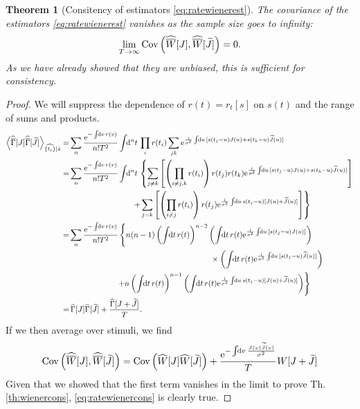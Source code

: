 \documentclass[12pt]{article}
\theoremstyle{slplain}
\newtheorem{thm}{Theorem}
\theoremstyle{sldefinition}
\theoremstyle{remark}
\newcommand{\tj}{\widetilde{J}}
\newcommand{\hz}{\widehat{\Gamma}}
\newcommand{\hhz}{\widehat{\overline{\Gamma}}}
\newcommand{\hw}{\widehat{W}}
\newcommand{\hhw}{\widehat{\overline{W}}}
\begin{document}
\begin{thm}[Consitency of estimators \eqref{eq:ratewienerest}]
  The covariance of the estimators \eqref{eq:ratewienerest} vanishes as the sample size goes to infinity:
  \begin{equation}\label{eq:ratewienercons}
    \lim_{T\to\infty} \cov\prn{ \hhw[J], \hhw[\tj] } = 0.
  \end{equation}
  As we have already showed that they are unbiased, this is sufficient for consistency.
\end{thm}
\begin{proof}
  We will suppress the dependence of $r(t)=r_t[s]$ on $s(t)$ and the range of sums and products.
  \begin{equation*}
    \begin{aligned}
      \av{\hhz[J]\hhz[\tj]}_{\widehat{\{t_i\}}|\hat{s}} =& \sum_n \frac{\e^{-\intd{v}r(v)}}{n!T^2} \intd{^nt} \prod_ir(t_i) \sum_{jk} \e^{\frac{\ir}{\sigma^2}\intd{u}[s(t_j-u)J(u)+s(t_k-u)\tj(u)]} \\
        =& \sum_n \frac{\e^{-\intd{v}r(v)}}{n!T^2} \intd{^nt} \left\{
         \sum_{j\neq k} \brk{\prn{\prod_{i\neq j,k} r(t_i)} r(t_j) r(t_k) \e^{\frac{\ir}{\sigma^2}\intd{u}[s(t_j-u)J(u)+s(t_k-u)\tj(u)]}}
        \right. \\&\left. \qquad\qquad\qquad\qquad
         + \sum_{j=k} \brk{\prn{\prod_{i\neq j} r(t_i)} r(t_j) \e^{\frac{\ir}{\sigma^2}\intd{u}s(t_j-u)[J(u)+\tj(u)]}}
        \right\} \\
      =& \sum_n \frac{\e^{-\intd{v}r(v)}}{n!T^2} \left\{
         n(n-1) \prn{\intd{t} r(t)}^{n-2} \prn{\intd{t} r(t) \e^{\frac{\ir}{\sigma^2}\intd{u}[s(t_j-u)J(u)]}}
         \right.\\& \qquad\qquad\qquad\qquad\qquad\qquad\qquad\qquad\qquad
         \times \prn{\intd{t} r(t) \e^{\frac{\ir}{\sigma^2}\intd{u}[s(t_j-u)\tj(u)]}}
         \\&
         \left. \qquad\qquad\qquad
         +  n \prn{\intd{t} r(t)}^{n-1} \prn{\intd{t} r(t) \e^{\frac{\ir}{\sigma^2}\intd{u}s(t_j-u)[J(u)+\tj(u)]}}
        \right\} \\
        =& \,\hz[J]\hz[\tj] + \frac{\hz[J+\tj]}{T}.
    \end{aligned}
  \end{equation*}
  If we then average over stimuli, we find
  \begin{equation*}
    \cov\prn{\hhw[J],\hhw[\tj]} = \cov\prn{\hw[J]\hw[\tj]} + \frac{\e^{-\intd{v}\frac{J(v)\tj(v)}{\sigma^2}}}{T}W[J+\tj]
  \end{equation*}
  Given that we showed that the first term vanishes in the limit to prove Th.\ref{th:wienercons}, \eqref{eq:ratewienercons} is clearly true.
\end{proof}
\end{document}
